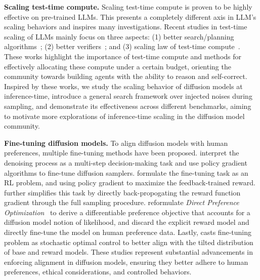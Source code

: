 \textbf{Scaling test-time compute.} Scaling test-time compute is proven to be highly effective on pre-trained LLMs. This presents a completely different axis in LLM's scaling behaviors and inspires many investigations. Recent studies in test-time scaling of LLMs mainly focus on three aspects: (1) better search/planning algorithms~\citep{wei2022chain,gandhi2024stream,su2024dualformer,xie2024monte}; (2) better verifiers~\citep{cobbe2021training,li2024process,wang2023math,lightman2023let}; and (3) scaling law of test-time compute~\citep{wu2024empirical,brown2024large,snell2024scaling}. These works highlight the importance of test-time compute and methods for effectively allocating these compute under a certain budget, orienting the community towards building agents with the ability to reason and self-correct. Inspired by these works, we study the scaling behavior of diffusion models at inference-time, introduce a general search framework over injected noises during sampling, and demonstrate its effectiveness across different benchmarks, aiming to motivate more explorations of inference-time scaling in the diffusion model community.

\textbf{Fine-tuning diffusion models.} To align diffusion models with human preferences, multiple fine-tuning methods have been proposed. \citet{fan023sft} interpret the denoising process as a multi-step decision-making task and use policy gradient algorithms to fine-tune diffusion samplers. \citet{fan2024reinforcement, black2023training} formulate the fine-tuning task as an RL problem, and using policy gradient to maximize the feedback-trained reward. \citet{xu2024imagereward, clark2024directly} further simplifies this task by directly back-propogating the reward function gradient through the full sampling procedure. \citet{wallace2024diffusion} reformulate \textit{Direct Preference Optimization}~\citep{rafailov2023dpo} to derive a differentiable preference objective that accounts for a diffusion model notion of likelihood, and \citet{yang2024using} discard the explicit reward model and directly fine-tune the model on human preference data. Lastly, \citet{carles2024adjoint} casts fine-tuning problem as stochastic optimal control to better align with the tilted distribution of base and reward models. These studies represent substantial advancements in enforcing alignment in diffusion models, ensuring they better adhere to human preferences, ethical considerations, and controlled behaviors.

